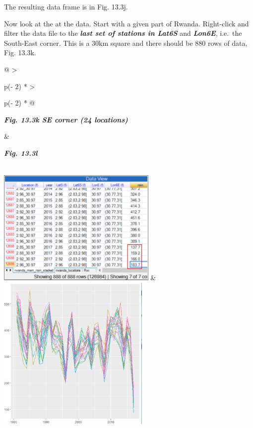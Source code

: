 \documentclass[
  letterpaper,
  DIV=11,
  numbers=noendperiod]{scrreprt}
\begin{document}
The resulting data frame is in Fig. 13.3j.

Now look at the at the data. Start with a given part of Rwanda.
Right-click and filter the data file to the \textbf{\emph{last set of
stations in Lat6S}} and \textbf{\emph{Lon6E}}, i.e.~the South-East
corner. This is a 30km square and there should be 880 rows of data, Fig.
13.3k.

\begin{longtable}[]{@{}
  >{\raggedright\arraybackslash}p{(\columnwidth - 2\tabcolsep) * }
  >{\raggedright\arraybackslash}p{(\columnwidth - 2\tabcolsep) * }@{}}
\toprule\noalign{}
\begin{minipage}[b]{\linewidth}\raggedright
\textbf{\emph{Fig. 13.3k SE corner (24 locations)}}
\end{minipage} & \begin{minipage}[b]{\linewidth}\raggedright
\textbf{\emph{Fig. 13.3l}}
\end{minipage} \\
\midrule\noalign{}
\endhead
\bottomrule\noalign{}
\endlastfoot
\includegraphics[width=3.02645in,height=2.21052in]{figures/Fig13.3k.png}
&
\includegraphics[width=2.89415in,height=2.95551in]{figures/Fig13.3l.png} \\
\end{longtable}
\end{document}
